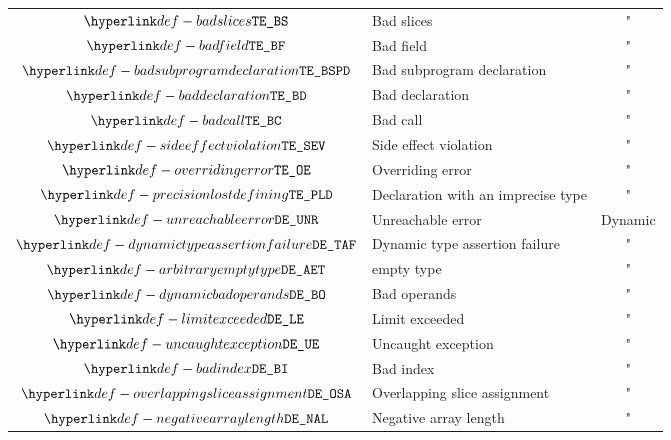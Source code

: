 \begin{center}
\begin{tabular}{clc}
  $\BadSlices$                   & Bad slices                     & "             \\
  $\BadField$                    & Bad field                      & "             \\
  $\BadSubprogramDeclaration$    & Bad subprogram declaration     & "             \\
  $\BadDeclaration$              & Bad declaration                & "             \\
  $\BadCall$                     & Bad call                       & "             \\
  $\SideEffectViolation$         & Side effect violation          & "             \\
  $\OverridingError$             & Overriding error               & "             \\
  $\PrecisionLostDefining$       & Declaration with an imprecise type & "         \\
  \hline
  $\UnreachableError$            & Unreachable error              & Dynamic       \\
  $\DynamicTypeAssertionFailure$ & Dynamic type assertion failure & "             \\
  $\ArbitraryEmptyType$          & \ARBITRARY{} empty type        & "             \\
  $\DynamicBadOperands$          & Bad operands                   & "             \\
  $\LimitExceeded$               & Limit exceeded                 & "             \\
  $\UncaughtException$           & Uncaught exception             & "             \\
  $\BadIndex$                    & Bad index                      & "             \\
  $\OverlappingSliceAssignment$  & Overlapping slice assignment   & "             \\
  $\NegativeArrayLength$         & Negative array length          & "             \\
\end{tabular}
\end{center}

